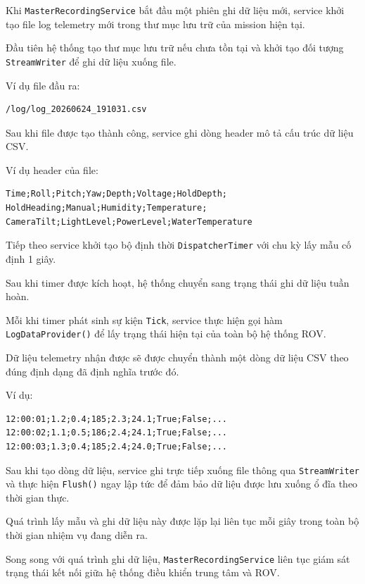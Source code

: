 \documentclass[../DoAn.tex]{subfiles}
\begin{document}
Khi \texttt{MasterRecordingService} bắt đầu một phiên ghi dữ liệu mới, service khởi tạo file log telemetry mới trong thư mục lưu trữ của mission hiện tại.

Đầu tiên hệ thống tạo thư mục lưu trữ nếu chưa tồn tại và khởi tạo đối tượng \texttt{StreamWriter} để ghi dữ liệu xuống file.

Ví dụ file đầu ra:

\begin{verbatim}
/log/log_20260624_191031.csv
\end{verbatim}

Sau khi file được tạo thành công, service ghi dòng header mô tả cấu trúc dữ liệu CSV.

Ví dụ header của file:

\begin{verbatim}
Time;Roll;Pitch;Yaw;Depth;Voltage;HoldDepth;
HoldHeading;Manual;Humidity;Temperature;
CameraTilt;LightLevel;PowerLevel;WaterTemperature
\end{verbatim}

Tiếp theo service khởi tạo bộ định thời \texttt{DispatcherTimer} với chu kỳ lấy mẫu cố định 1 giây.

Sau khi timer được kích hoạt, hệ thống chuyển sang trạng thái ghi dữ liệu tuần hoàn.

Mỗi khi timer phát sinh sự kiện \texttt{Tick}, service thực hiện gọi hàm \texttt{LogDataProvider()} để lấy trạng thái hiện tại của toàn bộ hệ thống ROV.

Dữ liệu telemetry nhận được sẽ được chuyển thành một dòng dữ liệu CSV theo đúng định dạng đã định nghĩa trước đó.

Ví dụ:

\begin{verbatim}
12:00:01;1.2;0.4;185;2.3;24.1;True;False;...
12:00:02;1.1;0.5;186;2.4;24.1;True;False;...
12:00:03;1.3;0.4;185;2.4;24.0;True;False;...
\end{verbatim}

Sau khi tạo dòng dữ liệu, service ghi trực tiếp xuống file thông qua \texttt{StreamWriter} và thực hiện \texttt{Flush()} ngay lập tức để đảm bảo dữ liệu được lưu xuống ổ đĩa theo thời gian thực.

Quá trình lấy mẫu và ghi dữ liệu này được lặp lại liên tục mỗi giây trong toàn bộ thời gian nhiệm vụ đang diễn ra.

Song song với quá trình ghi dữ liệu, \texttt{MasterRecordingService} liên tục giám sát trạng thái kết nối giữa hệ thống điều khiển trung tâm và ROV.
\end{document}

